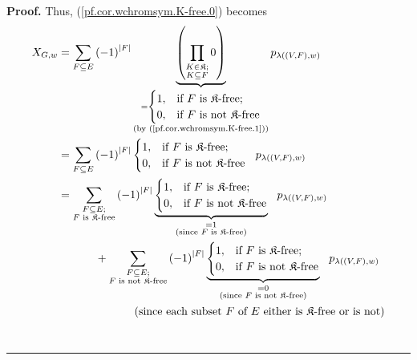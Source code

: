 \documentclass[numbers=enddot,12pt,final,onecolumn,notitlepage]{scrartcl}%
\theoremstyle{definition}
\newenvironment{proof}[1][Proof]{\noindent\textbf{#1.} }{\ \rule{0.5em}{0.5em}}
\newenvironment{verlong}{}{}
\let\sumnonlimits\sum
\let\prodnonlimits\prod
\renewcommand{\sum}{\sumnonlimits\limits}
\renewcommand{\prod}{\prodnonlimits\limits}
\begin{document}
\begin{verlong}
\begin{proof}
Thus, (\ref{pf.cor.wchromsym.K-free.0}) becomes%
\begin{align*}
X_{G,w}  &  =\sum_{F\subseteq E}\left(  -1\right)  ^{\left\vert F\right\vert
}\underbrace{\left(  \prod_{\substack{K\in\mathfrak{K};\\K\subseteq
F}}0\right)  }_{\substack{=%
\begin{cases}
1, & \text{if }F\text{ is }\mathfrak{K}\text{-free;}\\
0, & \text{if }F\text{ is not }\mathfrak{K}\text{-free}%
\end{cases}
\\\text{(by (\ref{pf.cor.wchromsym.K-free.1}))}}}p_{\lambda\left(  \left(
V,F\right)  ,w\right)  }\\
&  =\sum_{F\subseteq E}\left(  -1\right)  ^{\left\vert F\right\vert }%
\begin{cases}
1, & \text{if }F\text{ is }\mathfrak{K}\text{-free;}\\
0, & \text{if }F\text{ is not }\mathfrak{K}\text{-free}%
\end{cases}
\ \ p_{\lambda\left(  \left(  V,F\right)  ,w\right)  }\\
&  =\sum_{\substack{F\subseteq E;\\F\text{ is }\mathfrak{K}\text{-free}%
}}\left(  -1\right)  ^{\left\vert F\right\vert }\underbrace{%
\begin{cases}
1, & \text{if }F\text{ is }\mathfrak{K}\text{-free;}\\
0, & \text{if }F\text{ is not }\mathfrak{K}\text{-free}%
\end{cases}
}_{\substack{=1\\\text{(since }F\text{ is }\mathfrak{K}\text{-free)}%
}}\ \ p_{\lambda\left(  \left(  V,F\right)  ,w\right)  }\\
&  \ \ \ \ \ \ \ \ \ \ +\sum_{\substack{F\subseteq E;\\F\text{ is not
}\mathfrak{K}\text{-free}}}\left(  -1\right)  ^{\left\vert F\right\vert
}\underbrace{%
\begin{cases}
1, & \text{if }F\text{ is }\mathfrak{K}\text{-free;}\\
0, & \text{if }F\text{ is not }\mathfrak{K}\text{-free}%
\end{cases}
}_{\substack{=0\\\text{(since }F\text{ is not }\mathfrak{K}\text{-free)}%
}}\ \ p_{\lambda\left(  \left(  V,F\right)  ,w\right)  }\\
&  \ \ \ \ \ \ \ \ \ \ \ \ \ \ \ \ \ \ \ \ \left(  \text{since each subset
}F\text{ of }E\text{ either is }\mathfrak{K}\text{-free or is not}\right) \\

\end{align*}
\end{proof}
\end{verlong}
\end{document}
